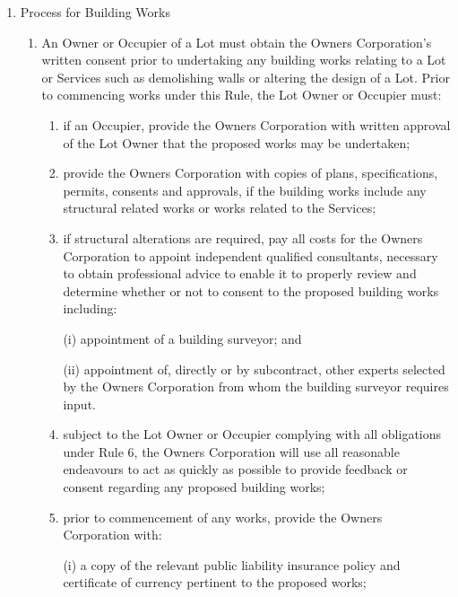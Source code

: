 \documentclass{article}
\begin{document}
\begin{enumerate}[label=\arabic*.]
\begin{enumerate}[label=\arabic{enumi}.\arabic*.]
\begin{enumerate}[label=\arabic{enumi}.\arabic*.]

\item  Process for Building Works

\begin{enumerate}[label=(\arabic*)]

\item  An Owner or Occupier of a Lot must obtain the Owners Corporation’s written consent prior to undertaking any building works relating to a Lot or Services such as demolishing walls or altering the design of a Lot. Prior to commencing works under this Rule, the Lot Owner or Occupier must:

\begin{enumerate}[label=(\alph*)]

\item  if an Occupier, provide the Owners Corporation with written approval of the Lot Owner that the proposed works may be undertaken;

\item  provide the Owners Corporation with copies of plans, specifications, permits, consents and approvals, if the building works include any structural related works or works related to the Services;

\item  if structural alterations are required, pay all costs for the Owners Corporation to appoint independent qualified consultants, necessary to obtain professional advice to enable it to properly review and determine whether or not to consent to the proposed building works including:

(i) appointment of a building surveyor; and

(ii) appointment of, directly or by subcontract, other experts selected by the Owners Corporation from whom the building surveyor requires input.

\item  subject to the Lot Owner or Occupier complying with all obligations under Rule 6, the Owners Corporation will use all reasonable endeavours to act as quickly as possible to provide feedback or consent regarding any proposed building works;

\item  prior to commencement of any works, provide the Owners Corporation with:

(i) a copy of the relevant public liability insurance policy and certificate of currency pertinent to the proposed works;


\end{enumerate}
\end{enumerate}
\end{enumerate}
\end{enumerate}
\end{enumerate}
\end{document}
